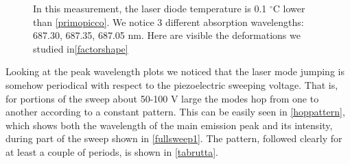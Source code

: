 \begin{figure}[!hptb]\centering
{} 
\caption{In this measurement, the laser diode temperature is 0.1 $^\circ$C lower than \cref{primopicco}. We notice 3 different absorption wavelengths: 687.30, 687.35, 687.05 nm. Here are visible the deformations we studied in\cref{factorshape}}\label{moltipicchi}
\end{figure} 

\medskip
Looking at the peak wavelength plots we noticed that the laser mode jumping is somehow periodical with respect to the piezoelectric sweeping voltage. That is, for portions of the sweep about 50-100 V large the modes hop from one to another according to a constant pattern.
This can be easily seen in \cref{hoppattern}, which shows both the wavelength of the main emission peak and its intensity, during part of the sweep shown in \cref{fullsweep1}. The pattern, followed clearly for at least a couple of periods, is shown in \cref{tabrutta}.

